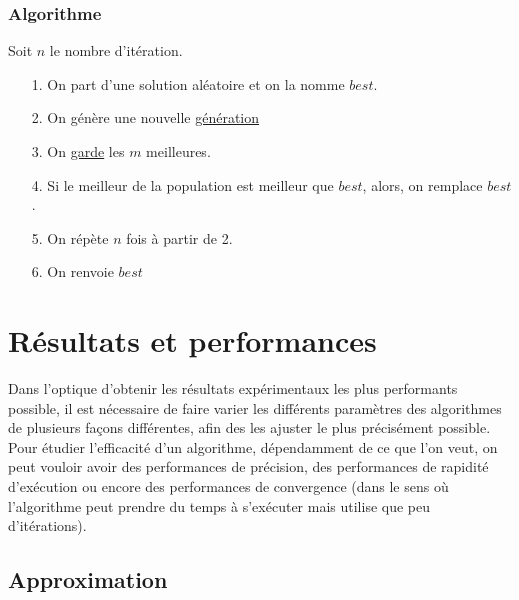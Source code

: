 \documentclass[11pt,french]{report}
\begin{document}
	\subsubsection{Algorithme}
	Soit $n$ le nombre d'itération.
	
	\begin{itemize}
		\item[1.] On part d'une solution aléatoire et on la nomme $best$.
		\item[2.] On génère une nouvelle \hyperref[Génération]{génération}
		\item[3.] On \hyperref[sélection]{garde} les $m$ meilleures.
		\item[4.] Si le meilleur de la population est meilleur que $best$, alors, on remplace $best$.
		\item[5.] On répète $n$ fois à partir de 2.
		\item[6.] On renvoie $best$
	\end{itemize}
	
	
	\section{Résultats et performances}

        Dans l'optique d'obtenir les résultats expérimentaux les plus performants possible, il est nécessaire de faire varier les différents paramètres des algorithmes de plusieurs façons différentes, afin des les ajuster le plus précisément possible. Pour étudier l'efficacité d'un algorithme, dépendamment de ce que l'on veut, on peut vouloir avoir des performances de précision, des performances de rapidité d'exécution ou encore des performances de convergence (dans le sens où l'algorithme peut prendre du temps à s'exécuter mais utilise que peu d'itérations).
        
        \subsection{Approximation}
        
\end{document}
